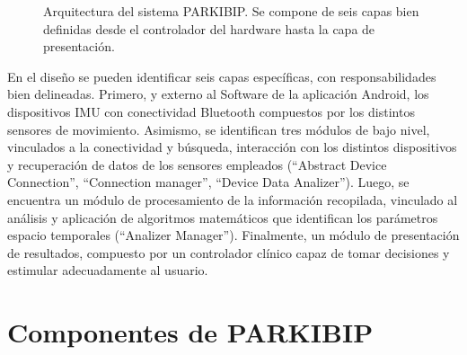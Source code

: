 \begin{figure}[!h]
\caption{Arquitectura del sistema PARKIBIP. Se compone de seis capas bien definidas desde el controlador del hardware hasta la capa de presentación. }
\label{FIG:Arquitectura2}
\end{figure}

En el diseño se pueden identificar seis capas específicas, con responsabilidades bien delineadas. Primero, y externo al Software de la aplicación Android, los dispositivos IMU con conectividad Bluetooth compuestos por los distintos sensores de movimiento. Asimismo, se identifican tres módulos de bajo nivel, vinculados a la conectividad y búsqueda, interacción con los distintos dispositivos y recuperación de datos de los sensores empleados (``Abstract Device Connection'', ``Connection manager'', ``Device Data Analizer''). Luego, se encuentra un módulo de procesamiento de la información recopilada, vinculado al análisis y aplicación de algoritmos matemáticos que identifican los parámetros espacio temporales (``Analizer Manager''). Finalmente, un módulo de presentación de resultados, compuesto por un controlador clínico capaz de tomar decisiones y estimular adecuadamente al usuario.

\section{Componentes de PARKIBIP}

